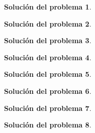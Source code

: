 \documentclass[twoside,12pt]{article}
\theoremstyle{definition}
\newtheorem{soln}{Solución del problema}
\begin{document}
\newpage
\begin{soln}

\end{soln}

\newpage
\begin{soln}

\end{soln}

\newpage
\begin{soln}

\end{soln}

\newpage
\begin{soln}

\end{soln}

\newpage
\begin{soln}

\end{soln}

\newpage
\begin{soln}

\end{soln}

\newpage
\begin{soln}

\end{soln}

\newpage
\begin{soln}

\end{soln}
\end{document}
